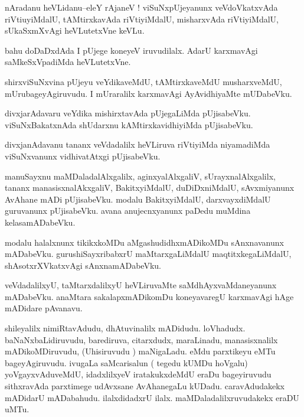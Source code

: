 \documentclass{article}
\begin{document}


\begin{mn}%
nAradanu heVLidanu--eleY rAjaneV ! viSuNxpUjeyanunx veVdoVkatxvAda riVtiuyiMdalU, 
tAMtirxkavAda riVtiyiMdalU, misharxvAda riVtiyiMdalU, sUkaSxmXvAgi heVLutetxVne keVLu.
\end{mn}

\begin{mn}%
bahu doDaDxdAda I pUjege koneyeV iruvudilalx. AdarU karxmavAgi saMkeSxVpadiMda heVLutetxVne.
\end{mn}

\begin{mn}%
shirxviSuNxvina pUjeyu veYdikaveMdU, tAMtirxkaveMdU musharxveMdU, mUrubageyAgiruvudu. I 
mUraralilx karxmavAgi AyAvidhiyaMte mUDabeVku.
\end{mn}

\begin{mn}%
divxjarAdavaru veYdika mishirxtavAda pUjegaLiMda pUjisabeVku. viSuNxBakatxnAda shUdarxnu 
kAMtirxkavidhiyiMda pUjisabeVku.
\end{mn}

\begin{mn}%
divxjanAdavanu tananx veVdadalilx heVLiruva riVtiyiMda niyamadiMda viSuNxvanunx 
vidhivatAtxgi pUjisabeVku.
\end{mn}

\begin{mn}%
manuSayxnu maMDaladalAlxgalilx, aginxyalAlxgaliV, sUrayxnalAlxgalilx, tananx 
manasisxnalAkxgaliV, BakitxyiMdalU, duDiDxniMdalU, sAvxmiyanunx AvAhane mADi pUjisabeVku. 
modalu BakitxyiMdalU, darxvayxdiMdalU guruvanunx pUjisabeVku. avana anujecnxyanunx paDedu 
muMdina kelasamADabeVku.
\end{mn}

\begin{mn}%
modalu halalxnunx tikikxkoMDu aMgashudidhxmADikoMDu sAnxnavanunx mADabeVku. 
gurushiSayxribabxrU maMtarxgaLiMdalU maqtitxkegaLiMdalU, shAsotxrXVkatxvAgi 
sAnxnamADabeVku.
\end{mn}

\begin{mn}%
veVdadalilxyU, taMtarxdalilxyU heVLiruvaMte saMdhAyxvaMdaneyanunx mADabeVku. anaMtara 
sakalapxmADikomDu koneyavaregU karxmavAgi hAge mADidare pAvanavu.
\end{mn}

\begin{mn}%
shileyalilx nimiRtavAdudu, dhAtuvinalilx mADidudu. loVhadudx. baNaNxbaLidiruvudu, barediruva,
citarxdudx, maraLinadu, manasisxnalilx mADikoMDiruvudu, (Uhisiruvudu ) maNigaLadu. eMdu 
parxtikeyu eMTu bageyAgiruvudu. ivugaLa saMcarisalun ( tegedu kUMDu hoVgalu)
yoVgayxvAduveMdU, idadxlilxyeV iratakukxdeMdU eraDu bageyiruvudu sithxravAda parxtimege 
udAvxsane AvAhanegaLu kUDadu. caravAdudakekx mADidarU mADabahudu. ilalxdidadxrU ilalx. 
maMDaladalilxruvudakekx eraDU uMTu.
\end{mn}
\end{document}
